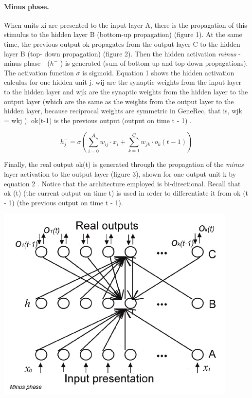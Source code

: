 \paragraph{Minus phase.} When units xi are presented to the input layer A, there is the propagation of this stimulus to the hidden layer B (bottom-up propagation) (figure 1). At the same time, the previous output ok propagates from the output layer C to the hidden layer B (top- down propagation) (figure 2). Then the hidden activation \emph{minus} - minus phase - ($h^-$ ) is generated (sum of bottom-up and top-down propagations). The activation function $\sigma$ is sigmoid. Equation 1 shows the hidden activation calculus for one hidden unit j. wij are the synaptic weights from the input layer to the hidden layer and wjk are the synaptic weights from the hidden layer to the output layer (which are the same as the weights from the output layer to the hidden layer, because reciprocal weights are symmetric in GeneRec, that is, wjk = wkj \citet{o1996bio}). ok(t-1) is the previous output (output on time t - 1) \citet{orru2008sabio}.

$$h_j^- = \sigma \left(\sum_{i=0}^A w_{ij} \cdot x_i + \sum_{k=1}^C w_{jk} \cdot o_k(t-1)\right)$$

Finally, the real output ok(t) is generated through the propagation of the \emph{minus} layer activation to the output layer (figure 3), shown for one output unit k by equation 2 \citet{o1996bio}. Notice that the architecture employed is bi-directional. Recall that ok (t) (the current output on time t) is used in order to differentiate it from ok (t - 1) (the previous output on time t - 1).

\begin{center} 
\includegraphics{img/generec_minus_phase.png} \citet{orru2008sabio} 
\end{center} 


